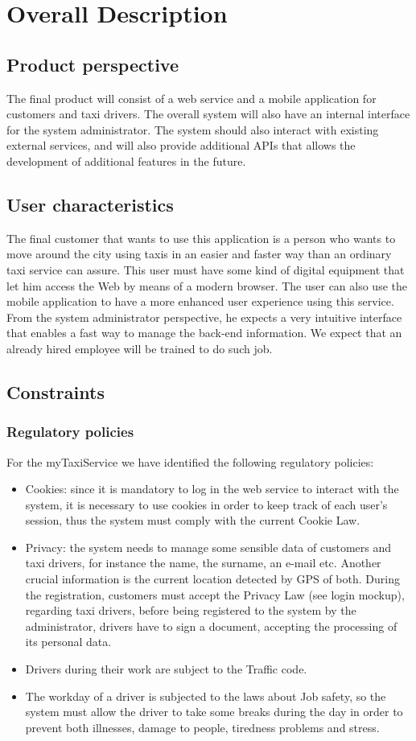 \documentclass[a4paper,12pt,dvipsnames]{article}%
\begin{document}
\section{Overall Description}
\subsection{Product perspective}
The final product will consist of a web service and a mobile application for customers and taxi drivers.
The overall system will also have an internal interface for the system administrator. The system should also interact with existing external services, and will also provide additional APIs that allows the development of additional features in the future. 
\subsection{User characteristics}
The final customer that wants to use this application is a person who wants to move around the city using taxis in an easier and faster way than an ordinary taxi service can assure. This user must have some kind of digital equipment that let him access the Web by means of a modern browser. The user can also use the mobile application to have a more enhanced user experience using this service.
From the system administrator perspective, he expects a very intuitive interface that enables a fast way to manage the back-end information. We expect that an already hired employee will be trained to do such job.
\subsection{Constraints}
\subsubsection{Regulatory policies}
For the myTaxiService we have identified the following regulatory policies:
\begin{itemize}
\item Cookies: since it is mandatory to log in the web service to interact with the system, it is necessary to use cookies in order to keep track of each user's session, thus the system must comply with the current Cookie Law.
\item Privacy: the system needs to manage some sensible data of customers and taxi drivers, for instance the name, the surname, an e-mail etc. Another crucial information is the current location detected by GPS of both. During the registration, customers must accept the Privacy Law (see login mockup), regarding taxi drivers, before being registered to the system by the administrator, drivers have to sign a document, accepting the processing of its personal data.
\item Drivers during their work are subject to the Traffic code.
\item The workday of a driver is subjected to the laws about Job safety, so the system must allow the driver to take some breaks during the day in order to prevent both illnesses, damage to people, tiredness problems and stress.
\end{itemize}
\end{document}
